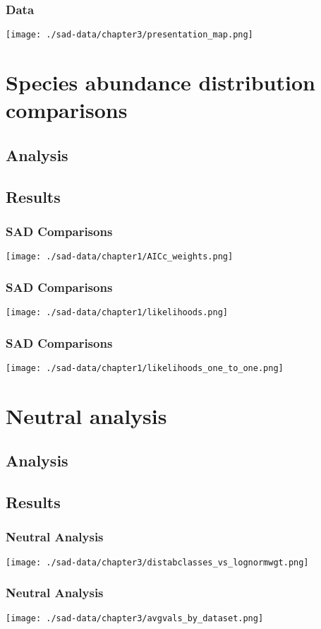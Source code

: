 \documentclass[14pt]{beamer}
\begin{document}
\begin{frame}{}
\frametitle{Data}
\texttt{[image: ./sad-data/chapter3/presentation\_map.png]}
\end{frame}



\section{Species abundance distribution comparisons}
\subsection{Analysis}
\subsection{Results}
\begin{frame}{}
\frametitle{SAD Comparisons}
\texttt{[image: ./sad-data/chapter1/AICc\_weights.png]}
\end{frame}

\begin{frame}{}
\frametitle{SAD Comparisons}
\texttt{[image: ./sad-data/chapter1/likelihoods.png]}
\end{frame}

\begin{frame}{}
\frametitle{SAD Comparisons}
\texttt{[image: ./sad-data/chapter1/likelihoods\_one\_to\_one.png]}
\end{frame}

\section{Neutral analysis}
\subsection{Analysis}
\subsection{Results}
\begin{frame}{}
\frametitle{Neutral Analysis}
\texttt{[image: ./sad-data/chapter3/distabclasses\_vs\_lognormwgt.png]}
\end{frame}

\begin{frame}{}
\frametitle{Neutral Analysis}
\texttt{[image: ./sad-data/chapter3/avgvals\_by\_dataset.png]}
\end{frame}
\end{document}
